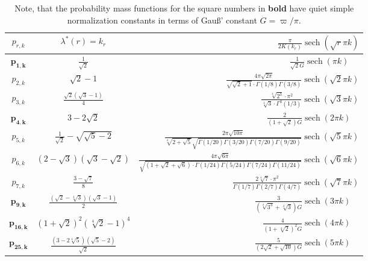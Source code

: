 \documentclass[12pt]{amsart}
\theoremstyle{definition}
\theoremstyle{remark}
\numberwithin{equation}{section}
\newcommand{\1}{\mathbbm{1}}
\begin{document}
\renewcommand{\arraystretch}{2}
\begin{table}[h]
    \centering
    \begin{tabular}{c|c|r}
$p_{r,k}$  &   $ \lambda^*(r) = k_r$ & $\frac{\pi}{2K(k_r)}\operatorname{sech} (\sqrt{r}\pi k)$\\
\hline
$\mathbf{p_{1,k}}$  & $\frac{1}{\sqrt{2}}$ & $\frac{1}{\sqrt{2}G} \operatorname{sech} (\pi k)\quad \ $\\
$p_{2,k}$  & $\sqrt{2}-1$ & $\frac{4 \pi\sqrt{2\pi}}{\sqrt{\sqrt{2}+1} \cdot \Gamma(1/8)\Gamma(3/8)} \operatorname{sech} (\sqrt{2}\pi k)$\\
$p_{3,k}$  & $\frac{\sqrt{2}\left(\sqrt{3}-1\right)}{4}$ & $\frac{\sqrt[4]{2^3} \cdot \pi^2 }{\sqrt[4]{3} \cdot \Gamma^3(1/3)}\operatorname{sech} (\sqrt{3}\pi k)$\\
$\mathbf{p_{4,k}}$  & $3-2\sqrt{2}$ & $\frac{2}{(1 + \sqrt{2})G}\operatorname{sech} (2\pi k)\quad$\\
$p_{5,k}$  & $\frac{1}{\sqrt{2}} - \sqrt{\sqrt{5}-2}$ & $\frac{2\pi \sqrt{10 \pi}}{\sqrt[4]{2+\sqrt{5}} \sqrt{\Gamma(1/20)\Gamma(3/20)\Gamma(7/20)\Gamma(9/20)}} \operatorname{sech} (\sqrt{5}\pi k)$\\
$p_{6,k}$  & $\left(2-\sqrt{3}\right)\left(\sqrt{3}-\sqrt{2}\right)$ & $\frac{4\pi \sqrt{6 \pi}}{\sqrt{(1 +\sqrt{2}+\sqrt{6}) \cdot \Gamma(1/24)\Gamma(5/24)\Gamma(7/24)\Gamma(11/24)}} \operatorname{sech} (\sqrt{6}\pi k)$\\
$p_{7,k}$  & $\frac{3-\sqrt{7}}{8}$ & $\frac{2\sqrt[4]{7} \cdot \pi^2}{\Gamma(1/7)\Gamma(2/7)\Gamma(4/7)} \operatorname{sech} (\sqrt{7}\pi k)$\\
$\mathbf{p_{9,k}}$  & $\frac{\left(\sqrt{2}-\sqrt[4]{3}\right)\left(\sqrt{3}-1\right)}{2}$ & $\frac{3}{\left(\sqrt[4]{3^3} + \sqrt[4]{3} \right) G} \operatorname{sech} (3\pi k)\quad$\\
$\mathbf{p_{16,k}}$  & $\left(1 + \sqrt{2}\right)^2 \left(\sqrt[4]{2} - 1\right)^4$ & $\frac{4}{\left(1 + \sqrt[4]{2} \right)^2 G} \operatorname{sech} (4\pi k)\quad$\\
$\mathbf{p_{25,k}}$  & $\frac{\left(3 - 2 \sqrt[4]{5}\right)\left(\sqrt{5} - 2\right)}{\sqrt{2}}$ & $\frac{5}{\left(2\sqrt{2} + \sqrt{10} \right) G} \operatorname{sech} (5\pi k) \quad$
\end{tabular}
    \caption{Note, that the probability mass functions for the square numbers in \textbf{bold} have quiet simple normalization constants in terms of Gau\ss' constant $G=\varpi/\pi$.}
    \label{tab:sqrt_r_sech}
\end{table}
\end{document}
